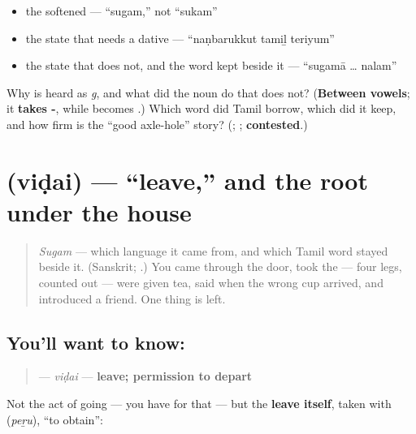\begin{itemize}
\raggedright
  \item the softened  — \textquotedblleft{}sugam,\textquotedblright{} not \textquotedblleft{}sukam\textquotedblright{}
  \item the state that needs a dative — \textquotedblleft{}naṇbarukkut tamiḻ teriyum\textquotedblright{}
  \item the state that does not, and the word kept beside it — \textquotedblleft{}sugamā … nalam\textquotedblright{}
\end{itemize}

\begin{tcolorbox}[breakable,colback=teal!4,colframe=teal!35!black,title={Before you move on}]
Why is \textbf{} heard as \emph{g}, and what did the noun do that \textbf{} does not? (\textbf{Between vowels}; it \textbf{takes -}, while \textbf{} becomes \textbf{}.) Which word did Tamil borrow, which did it keep, and how firm is the \textquotedblleft{}good axle-hole\textquotedblright{} story? (\textbf{}; \textbf{}; \textbf{contested}.)
\end{tcolorbox}
\section[\texorpdfstring{\ta{விடை} (viḍai)}{விடை (viḍai)}]{ (viḍai) — \textquotedblleft{}leave,\textquotedblright{} and the root under the house}

\label{lesson:TA-C38-vidai}



\begin{quote}
\emph{Sugam} — which language it came from, and which Tamil word stayed beside it. (Sanskrit; \textbf{}.) You came through the door, took the \textbf{} — four legs, counted out — were given tea, said \textbf{ } when the wrong cup arrived, and introduced a friend. One thing is left.
\end{quote}

\subsection*{You'll want to know: }
\begin{quote}
\textbf{} — \emph{viḍai} — \textbf{leave; permission to depart}
\end{quote}

Not the act of going — you have \textbf{ } for that — but the \textbf{leave itself}, taken with \textbf{} (\emph{peṟu}), \textquotedblleft{}to obtain\textquotedblright{}:

